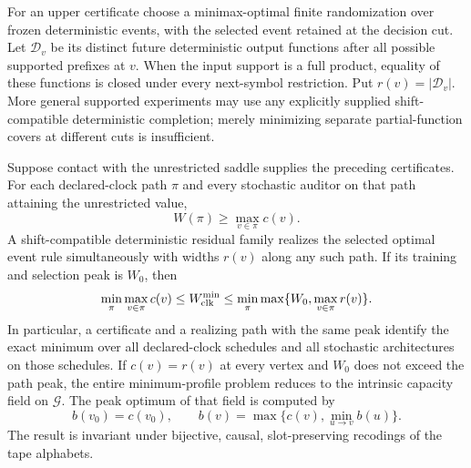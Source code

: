 For an upper certificate choose a minimax-optimal finite randomization
over frozen deterministic events, with the selected event retained at
the decision cut. Let $\mathcal D_v$ be its distinct future deterministic
output functions after all possible supported prefixes at $v$.
When the input support is a full product, equality of these functions
is closed under every next-symbol restriction. Put $r(v)=|\mathcal D_v|$.
More general supported experiments may use any explicitly supplied
shift-compatible deterministic completion; merely minimizing separate
partial-function covers at different cuts is insufficient.

\begin{theorem}
\label{thm:facial-schedule}
Suppose contact with the unrestricted saddle supplies the preceding
certificates. For each declared-clock path $\pi$ and every stochastic
auditor on that path attaining the unrestricted value,
\begin{equation}\label{eq:path-lower}
             W(\pi)\ge\max_{v\in\pi}c(v).
\end{equation}
A shift-compatible deterministic residual family realizes the selected
optimal event rule simultaneously with widths $r(v)$ along any such
path. If its training and selection peak is $W_0$, then
\begin{equation}\label{eq:path-upper}
 \min_{\pi}\max_{v\in\pi}c(v)
 \le W_{\rm clk}^{\min}
 \le\min_{\pi}\max\{W_0,\max_{v\in\pi}r(v)\}.
\end{equation}
In particular, a certificate and a realizing path with the same peak
identify the exact minimum over all declared-clock schedules and all
stochastic architectures on those schedules. If $c(v)=r(v)$ at every
vertex and $W_0$ does not exceed the path peak, the entire minimum-profile
problem reduces to the intrinsic capacity field on $\mathcal G$.
The peak optimum of that field is computed by
\begin{equation}\label{eq:bottleneck-recursion}
 b(v_0)=c(v_0),\qquad
 b(v)=\max\{c(v),\min_{u\to v}b(u)\}.
\end{equation}
The result is invariant under bijective, causal, slot-preserving
recodings of the tape alphabets.
\end{theorem}
